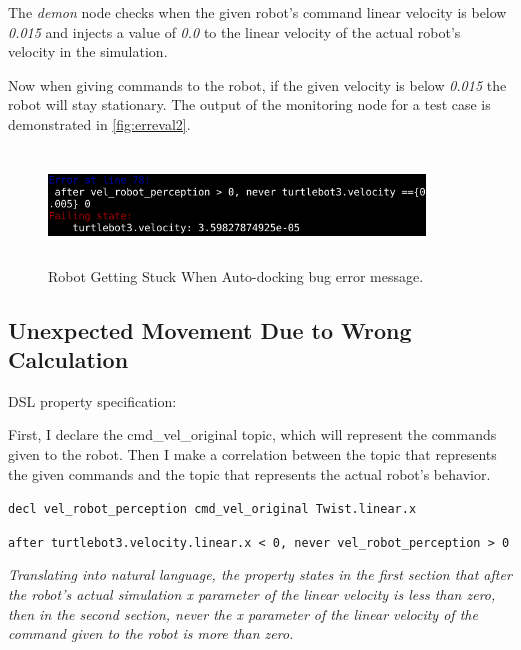 The \textit{demon} node checks when the given robot's command linear velocity is below \textit{0.015} and injects a value of \textit{0.0} to the linear velocity of the actual robot's velocity in the simulation.

Now when giving commands to the robot, if the given velocity is below \textit{0.015} the robot will stay stationary. The output of the monitoring node for a test case is demonstrated in \autoref{fig:erreval2}.

\begin{figure}
\begin{center}
\includegraphics[width=10cm,height=3cm,keepaspectratio,]{images/erreval2.png}
\caption{Robot Getting Stuck When Auto-docking bug error message.} \label{fig:erreval2}
\end{center}
\end{figure}


\subsection{Unexpected Movement Due to Wrong Calculation}
\label{ssec:unexpectedmovementduetowrongcalculation}

DSL property specification:

First, I declare the cmd\_vel\_original topic, which will represent the commands given to the robot.
Then I make a correlation between the topic that represents the given commands and the topic that represents the actual robot's behavior.

\texttt{decl vel\_robot\_perception cmd\_vel\_original Twist.linear.x}

\texttt{after turtlebot3.velocity.linear.x < 0, never vel\_robot\_perception > 0}

\textit{Translating into natural language, the property states in the first section that after the robot's actual simulation x parameter of the linear velocity is less than zero, then in the second section, never the x parameter of the linear velocity of the command given to the robot is more than zero.}

